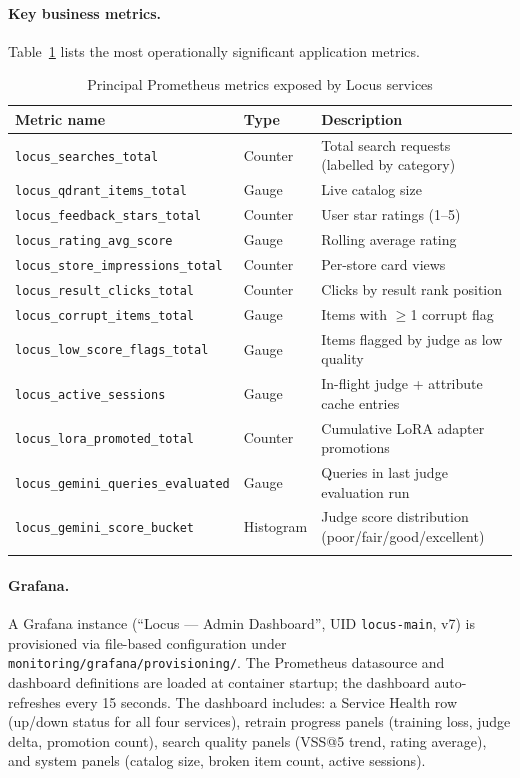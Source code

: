 \documentclass[12pt]{article}
\begin{document}
\paragraph{Key business metrics.} Table~\ref{tab:metrics} lists the most operationally significant application metrics.

\begin{longtable}{@{}lll@{}}
\toprule
\textbf{Metric name} & \textbf{Type} & \textbf{Description} \\ \midrule
\endhead
\texttt{locus\_searches\_total}          & Counter   & Total search requests (labelled by category) \\
\texttt{locus\_qdrant\_items\_total}     & Gauge     & Live catalog size \\
\texttt{locus\_feedback\_stars\_total}   & Counter   & User star ratings (1--5) \\
\texttt{locus\_rating\_avg\_score}       & Gauge     & Rolling average rating \\
\texttt{locus\_store\_impressions\_total}& Counter   & Per-store card views \\
\texttt{locus\_result\_clicks\_total}    & Counter   & Clicks by result rank position \\
\texttt{locus\_corrupt\_items\_total}    & Gauge     & Items with $\ge$1 corrupt flag \\
\texttt{locus\_low\_score\_flags\_total} & Gauge     & Items flagged by judge as low quality \\
\texttt{locus\_active\_sessions}         & Gauge     & In-flight judge + attribute cache entries \\
\texttt{locus\_lora\_promoted\_total}    & Counter   & Cumulative LoRA adapter promotions \\
\texttt{locus\_gemini\_queries\_evaluated}& Gauge    & Queries in last judge evaluation run \\
\texttt{locus\_gemini\_score\_bucket}    & Histogram & Judge score distribution (poor/fair/good/excellent) \\ \bottomrule
\caption{Principal Prometheus metrics exposed by Locus services}
\label{tab:metrics}
\end{longtable}

\paragraph{Grafana.}
A Grafana instance (``Locus --- Admin Dashboard'', UID \texttt{locus-main}, v7) is provisioned via file-based configuration under \texttt{monitoring/grafana/provisioning/}. The Prometheus datasource and dashboard definitions are loaded at container startup; the dashboard auto-refreshes every 15 seconds. The dashboard includes: a Service Health row (up/down status for all four services), retrain progress panels (training loss, judge delta, promotion count), search quality panels (VSS@5 trend, rating average), and system panels (catalog size, broken item count, active sessions).
\end{document}
